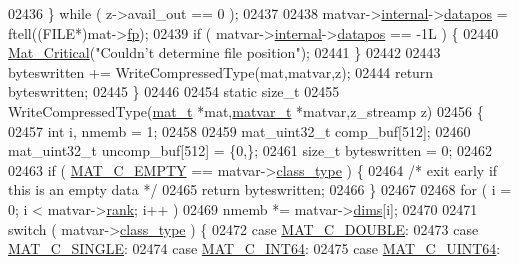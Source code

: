 \begin{DoxyCode}
{{{{{{{{{{{{{{{{02436     \} \textcolor{keywordflow}{while} ( z->avail\_out == 0 );
02437 
02438     matvar->\hyperlink{group___m_a_t_a6e97e3ed9f40c49322c18561c2a94e92}{internal}->\hyperlink{structmatvar__internal_afd3bfaab126a160bd6855563e1ea0a7e}{datapos} = ftell((FILE*)mat->\hyperlink{struct__mat__t_a85f562e407ca9ad4d2a6e14f839432b7}{fp});
02439     \textcolor{keywordflow}{if} ( matvar->\hyperlink{group___m_a_t_a6e97e3ed9f40c49322c18561c2a94e92}{internal}->\hyperlink{structmatvar__internal_afd3bfaab126a160bd6855563e1ea0a7e}{datapos} == -1L ) \{
02440         \hyperlink{group__mat__util_gaf51f2bfbb5580f575e4dd79757e2b80c}{Mat\_Critical}(\textcolor{stringliteral}{"Couldn't determine file position"});
02441     \}
02442 
02443     byteswritten += WriteCompressedType(mat,matvar,z);
02444     \textcolor{keywordflow}{return} byteswritten;
02445 \}
02446 
02454 \textcolor{keyword}{static} \textcolor{keywordtype}{size\_t}
02455 WriteCompressedType(\hyperlink{struct__mat__t}{mat\_t} *mat,\hyperlink{group___m_a_t_structmatvar__t}{matvar\_t} *matvar,z\_streamp z)
02456 \{
02457     \textcolor{keywordtype}{int} i, nmemb = 1;
02458 
02459     mat\_uint32\_t comp\_buf[512];
02460     mat\_uint32\_t uncomp\_buf[512] = \{0,\};
02461     \textcolor{keywordtype}{size\_t} byteswritten = 0;
02462 
02463     \textcolor{keywordflow}{if} ( \hyperlink{group___m_a_t_ggad4d60ae7b709fc81bfd744fb4c857c40a5c76eef0ca0373d25abe49053be6fa9a}{MAT\_C\_EMPTY} == matvar->\hyperlink{group___m_a_t_aff13035bf3265dd7d9425e5d40c839d4}{class\_type} ) \{
02464         \textcolor{comment}{/* exit early if this is an empty data */}
02465         \textcolor{keywordflow}{return} byteswritten;
02466     \}
02467 
02468     \textcolor{keywordflow}{for} ( i = 0; i < matvar->\hyperlink{group___m_a_t_a84ba70c96ded13cc555fa75b768d9921}{rank}; i++ )
02469         nmemb *= matvar->\hyperlink{group___m_a_t_a8e01234e1c862ce3472bb37f5a09b92c}{dims}[i];
02470 
02471     switch ( matvar->\hyperlink{group___m_a_t_aff13035bf3265dd7d9425e5d40c839d4}{class\_type} ) \{
02472         \textcolor{keywordflow}{case} \hyperlink{group___m_a_t_ggad4d60ae7b709fc81bfd744fb4c857c40a5d70e0862e5bdb7bd86bf7ba5948f307}{MAT\_C\_DOUBLE}:
02473         \textcolor{keywordflow}{case} \hyperlink{group___m_a_t_ggad4d60ae7b709fc81bfd744fb4c857c40a2825631e26a961cbe0f79db50a39cea2}{MAT\_C\_SINGLE}:
02474         \textcolor{keywordflow}{case} \hyperlink{group___m_a_t_ggad4d60ae7b709fc81bfd744fb4c857c40a1ea83bcde49b35477494412973f82409}{MAT\_C\_INT64}:
02475         \textcolor{keywordflow}{case} \hyperlink{group___m_a_t_ggad4d60ae7b709fc81bfd744fb4c857c40a86470e25c3763d9a24623f04326195dd}{MAT\_C\_UINT64}:
}}}}}}}}}}}}}}}}
\end{DoxyCode}
